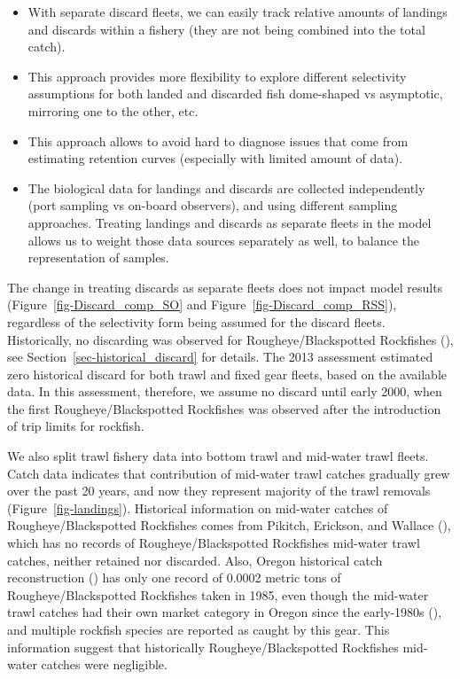 \documentclass[
]{scrartcl}
\providecommand{\tightlist}{%
  \setlength{\itemsep}{0pt}\setlength{\parskip}{0pt}}\usepackage{longtable,booktabs,array}
\begin{document}
\begin{itemize}
\tightlist
\item
  With separate discard fleets, we can easily track relative amounts of
  landings and discards within a fishery (they are not being combined
  into the total catch).
\item
  This approach provides more flexibility to explore different
  selectivity assumptions for both landed and discarded fish dome-shaped
  vs asymptotic, mirroring one to the other, etc.
\item
  This approach allows to avoid hard to diagnose issues that come from
  estimating retention curves (especially with limited amount of data).
\item
  The biological data for landings and discards are collected
  independently (port sampling vs on-board observers), and using
  different sampling approaches. Treating landings and discards as
  separate fleets in the model allows us to weight those data sources
  separately as well, to balance the representation of samples.
\end{itemize}

The change in treating discards as separate fleets does not impact model
results (Figure~\ref{fig-Discard_comp_SO} and
Figure~\ref{fig-Discard_comp_RSS}), regardless of the selectivity form
being assumed for the discard fleets. Historically, no discarding was
observed for Rougheye/Blackspotted Rockfishes
(), see Section~\ref{sec-historical_discard} for details. The 2013
assessment estimated zero historical discard for both trawl and fixed
gear fleets, based on the available data. In this assessment, therefore,
we assume no discard until early 2000, when the first
Rougheye/Blackspotted Rockfishes was observed after the introduction of
trip limits for rockfish.

We also split trawl fishery data into bottom trawl and mid-water trawl
fleets. Catch data indicates that contribution of mid-water trawl
catches gradually grew over the past 20 years, and now they represent
majority of the trawl removals (Figure~\ref{fig-landings}). Historical
information on mid-water catches of Rougheye/Blackspotted Rockfishes
comes from Pikitch, Erickson, and Wallace
(), which has no records of
Rougheye/Blackspotted Rockfishes mid-water trawl catches, neither
retained nor discarded. Also, Oregon historical catch reconstruction
() has only one record of 0.0002 metric tons of
Rougheye/Blackspotted Rockfishes taken in 1985, even though the
mid-water trawl catches had their own market category in Oregon since
the early-1980s (), and multiple rockfish species are
reported as caught by this gear. This information suggest that
historically Rougheye/Blackspotted Rockfishes mid-water catches were
negligible.
\end{document}
